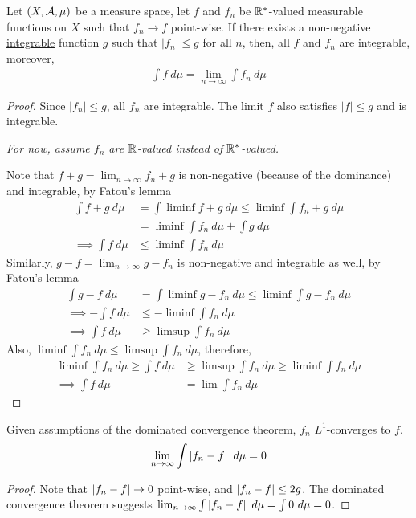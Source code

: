 \documentclass[11pt]{article}
\begin{document}
	\begin{theorem}
		Let $(X, \mathcal{{A}}, \mu)$ be a measure space, let $f$ and $f_n$ be $\mathbb{R}^*$-valued measurable functions on $X$ such that $f_n \to f$ point-wise. If there exists a non-negative \ul{integrable} function $g$ such that $|f_n| \leq g$ for all $n$, then, all $f$ and $f_n$ are integrable, moreover,
		\begin{align}
			\int f\ d\mu = \lim_{n\to\infty} \int f_n\ d\mu
		\end{align}
		\begin{proof}
			Since $|f_n| \leq g$, all $f_n$ are integrable. The limit $f$ also satisfies $|f| \leq g$ and is integrable.
			
			\emph{For now, assume $f_n$ are $\mathbb{R}$-valued instead of $\mathbb{R}^*$-valued.}
			
			Note that $f + g = \lim_{n\to\infty} f_n + g$ is non-negative (because of the dominance) and integrable, by Fatou's lemma
			\begin{align}
				\int f + g\ d\mu &= \int \liminf f + g\ d\mu \leq \liminf \int f_n + g\ d\mu \\
				&= \liminf \int f_n\ d\mu + \int g\ d\mu \\
				\implies \int f\ d\mu &\leq \liminf \int f_n\ d\mu
			\end{align}
			Similarly, $g - f = \lim_{n\to\infty} g - f_n$ is non-negative and integrable as well, by Fatou's lemma
			\begin{align}
				\int g - f\ d\mu &= \int \liminf g - f_n\ d\mu \leq \liminf \int g - f_n\ d\mu \\
				\implies - \int f\ d\mu &\leq - \liminf \int f_n\ d\mu \\
				\implies \int f\ d\mu &\geq \limsup \int f_n \ d\mu
			\end{align}
			Also, $\liminf \int f_n\ d\mu \leq \limsup \int f_n\ d\mu$, therefore,
			\begin{align}
				\liminf \int f_n\ d\mu \geq \int f\ d\mu &\geq \limsup \int f_n \ d\mu \geq \liminf \int f_n\ d\mu  \\
				\implies \int f\ d\mu &= \lim \int f_n\ d\mu
			\end{align}
		\end{proof}
	\end{theorem}
	
	\begin{proposition}
		Given assumptions of the dominated convergence theorem, $f_n$ $L^1$-converges to $f$.
		\begin{align}
			\lim_{n\to\infty} \int \left \vert {f_n - f} \right \vert\ d\mu = 0
		\end{align}
		\begin{proof}
			Note that $\left \vert {f_n - f} \right \vert \to 0$ point-wise, and $\left \vert {f_n - f} \right \vert \leq 2 g$. The dominated convergence theorem suggests $\lim_{n\to\infty} \int \left \vert {f_n - f} \right \vert\ d\mu = \int 0\ d\mu = 0$.
		\end{proof}
	\end{proposition}
	
\end{document}
